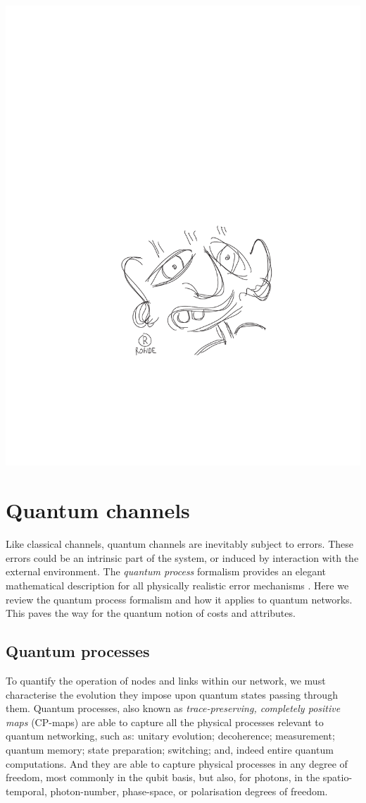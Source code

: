 \documentclass[aps, rmp, twocolumn, amsmath, amssymb, nofootinbib, superscriptaddress, longbibliography, floatfix, table-of-contents, eqsecnum]{revtex4-1}
\begin{document}
\begin{center}
	\includegraphics[width=0.6\columnwidth]{sketch_6}
\end{center}

%
%

\section{Quantum channels} \label{sec:quant_chan} 

Like classical channels, quantum channels are inevitably subject to errors. These errors could be an intrinsic part of the system, or induced by interaction with the external environment. The \textit{quantum process} formalism provides an elegant mathematical description for all physically realistic error mechanisms \cite{bib:NielsenChuang00, bib:Gilchrist05}. Here we review the quantum process formalism and how it applies to quantum networks. This paves the way for the quantum notion of costs and attributes.

%
%

\subsection{Quantum processes} 

To quantify the operation of nodes and links within our network, we must characterise the evolution they impose upon quantum states passing through them. Quantum processes, also known as \textit{trace-preserving, completely positive maps} (CP-maps) are able to capture all the physical processes relevant to quantum networking, such as: unitary evolution; decoherence; measurement; quantum memory; state preparation; switching; and, indeed entire quantum computations. And they are able to capture physical processes in any degree of freedom, most commonly in the qubit basis, but also, for photons, in the spatio-temporal, photon-number, phase-space, or polarisation degrees of freedom.
\end{document}
